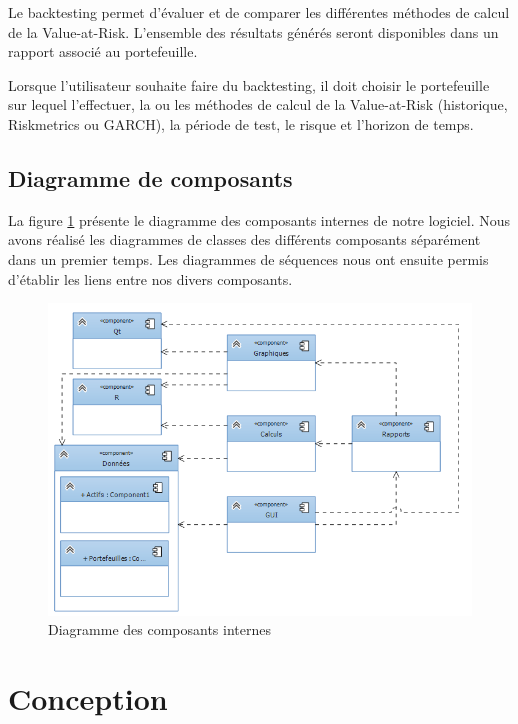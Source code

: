 \documentclass[a4paper,titlepage,french]{report}
\begin{document}
Le backtesting permet d'évaluer et de comparer les différentes méthodes de calcul de la Value-at-Risk.
L'ensemble des résultats générés seront disponibles dans un rapport associé au portefeuille.

Lorsque l'utilisateur souhaite faire du backtesting, il doit choisir le portefeuille sur lequel l'effectuer, la ou les méthodes de calcul de la Value-at-Risk (historique, Riskmetrics ou GARCH), la période de test, le risque et l'horizon de temps.


\section{Diagramme de composants}

La figure \ref{fig:diagramme-composants} présente le diagramme des composants internes de notre logiciel.
Nous avons réalisé les diagrammes de classes des différents composants séparément dans un premier temps.
Les diagrammes de séquences nous ont ensuite permis d'établir les liens entre nos divers composants.


\begin{figure}
  	\center
  	\includegraphics[width=1\textwidth]{architecture_generale.png}
  	\caption{Diagramme des composants internes}
  	\label{fig:diagramme-composants}
\end{figure}



\chapter{Conception}
\end{document}
